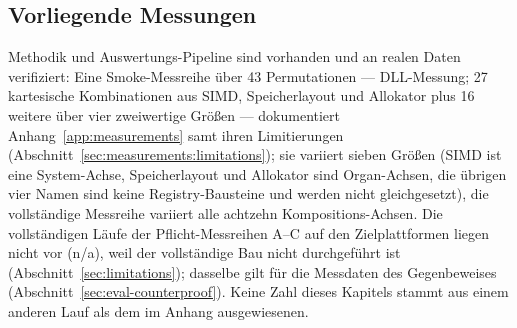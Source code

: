 \subsection{Vorliegende Messungen}\label{sec:eval-available}
Methodik und Auswertungs-Pipeline sind vorhanden und an realen Daten verifiziert: Eine Smoke-Messreihe
über 43 Permutationen --- DLL-Messung; 27 kartesische Kombinationen aus SIMD, Speicherlayout
und Allokator plus 16 weitere über vier zweiwertige Größen --- dokumentiert
Anhang~\ref{app:measurements} samt ihren Limitierungen
(Abschnitt~\ref{sec:measurements:limitations}); sie variiert sieben Größen (SIMD ist eine
System-Achse, Speicherlayout und Allokator sind Organ-Achsen, die übrigen vier Namen sind keine
Registry-Bausteine und werden nicht gleichgesetzt), die vollständige Messreihe variiert alle achtzehn
Kompositions-Achsen. Die vollständigen Läufe der Pflicht-Messreihen A--C auf den
Zielplattformen liegen nicht vor (n/a), weil der vollständige Bau nicht
durchgeführt ist (Abschnitt~\ref{sec:limitations}); dasselbe gilt für die Messdaten des Gegenbeweises
(Abschnitt~\ref{sec:eval-counterproof}). Keine Zahl dieses Kapitels stammt aus einem anderen Lauf als
dem im Anhang ausgewiesenen.


